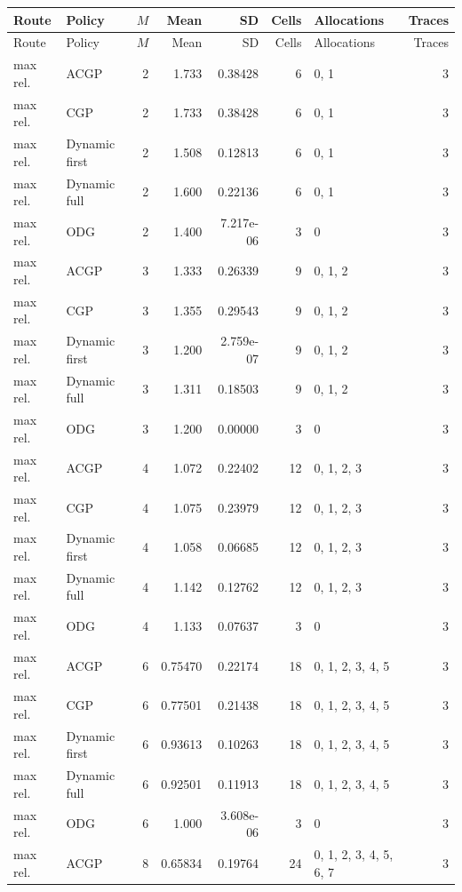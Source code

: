 \documentclass[10pt,a4paper]{article}
\begin{document}
\tiny\setlength{\tabcolsep}{2pt}\begin{longtable}{@{}p{23mm}p{29mm}rrrrp{36mm}r@{}}
\toprule Route & Policy & $M$ & Mean & SD & Cells & Allocations & Traces \\ \midrule\endfirsthead
\toprule Route & Policy & $M$ & Mean & SD & Cells & Allocations & Traces \\ \midrule\endhead
\bottomrule\endfoot
max rel. & ACGP & 2 & 1.733 & 0.38428 & 6 & 0, 1 & 3 \\
max rel. & CGP & 2 & 1.733 & 0.38428 & 6 & 0, 1 & 3 \\
max rel. & Dynamic first & 2 & 1.508 & 0.12813 & 6 & 0, 1 & 3 \\
max rel. & Dynamic full & 2 & 1.600 & 0.22136 & 6 & 0, 1 & 3 \\
max rel. & ODG & 2 & 1.400 & 7.217e-06 & 3 & 0 & 3 \\
max rel. & ACGP & 3 & 1.333 & 0.26339 & 9 & 0, 1, 2 & 3 \\
max rel. & CGP & 3 & 1.355 & 0.29543 & 9 & 0, 1, 2 & 3 \\
max rel. & Dynamic first & 3 & 1.200 & 2.759e-07 & 9 & 0, 1, 2 & 3 \\
max rel. & Dynamic full & 3 & 1.311 & 0.18503 & 9 & 0, 1, 2 & 3 \\
max rel. & ODG & 3 & 1.200 & 0.00000 & 3 & 0 & 3 \\
max rel. & ACGP & 4 & 1.072 & 0.22402 & 12 & 0, 1, 2, 3 & 3 \\
max rel. & CGP & 4 & 1.075 & 0.23979 & 12 & 0, 1, 2, 3 & 3 \\
max rel. & Dynamic first & 4 & 1.058 & 0.06685 & 12 & 0, 1, 2, 3 & 3 \\
max rel. & Dynamic full & 4 & 1.142 & 0.12762 & 12 & 0, 1, 2, 3 & 3 \\
max rel. & ODG & 4 & 1.133 & 0.07637 & 3 & 0 & 3 \\
max rel. & ACGP & 6 & 0.75470 & 0.22174 & 18 & 0, 1, 2, 3, 4, 5 & 3 \\
max rel. & CGP & 6 & 0.77501 & 0.21438 & 18 & 0, 1, 2, 3, 4, 5 & 3 \\
max rel. & Dynamic first & 6 & 0.93613 & 0.10263 & 18 & 0, 1, 2, 3, 4, 5 & 3 \\
max rel. & Dynamic full & 6 & 0.92501 & 0.11913 & 18 & 0, 1, 2, 3, 4, 5 & 3 \\
max rel. & ODG & 6 & 1.000 & 3.608e-06 & 3 & 0 & 3 \\
max rel. & ACGP & 8 & 0.65834 & 0.19764 & 24 & 0, 1, 2, 3, 4, 5, 6, 7 & 3 \\

\end{longtable}
\end{document}
